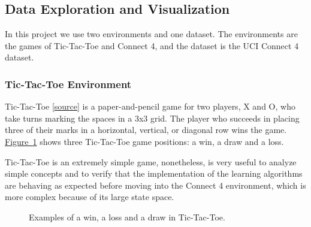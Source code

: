 \documentclass{article}
\newcommand{\GithubURL}[1]{[\href{https://github.com/davidrobles/mlnd-capstone-code/blob/master/#1}{source}]}
\begin{document}
\subsection{Data Exploration and Visualization}

In this project we use two environments and one dataset. The environments are the games of
Tic-Tac-Toe and Connect 4, and the dataset is the UCI Connect 4 dataset.

\subsubsection{Tic-Tac-Toe Environment}

Tic-Tac-Toe \GithubURL{capstone/game/games/tictactoe.py} is a paper-and-pencil game for two players,
X and O, who take turns marking the spaces in a 3x3 grid. The player who succeeds in placing three
of their marks in a horizontal, vertical, or diagonal row wins the game.
\hyperref[fig:tic-env]{Figure~\ref*{fig:tic-env}} shows three Tic-Tac-Toe game positions: a win, a
draw and a loss.

Tic-Tac-Toe is an extremely simple game, nonetheless, is very useful to analyze simple concepts and
to verify that the implementation of the learning algorithms are behaving as expected before moving
into the Connect 4 environment, which is more complex because of its large state space.


\begin{figure}[!b]
    \centering
     \hspace{0.2in}
     \hspace{0.2in}
    \caption{Examples of a win, a loss and a draw in Tic-Tac-Toe.}
    \label{fig:tic-env}
\end{figure}
\end{document}
